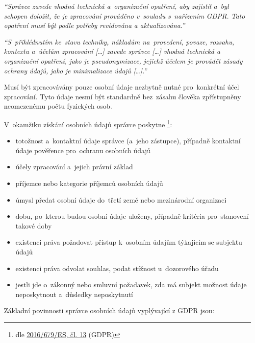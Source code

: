 \emph{\enquote{Správce zavede vhodná technická a~organizační opatření, aby zajistil a~byl schopen doložit, že je zpracování prováděno v~souladu s~nařízením GDPR. Tato opatření musí být podle potřeby revidována a aktualizována.}}

\emph{\enquote{S~přihlédnutím ke~stavu techniky, nákladům na~provedení, povaze, rozsahu, kontextu a~účelům zpracování [\dots] zavede správce [\dots] vhodná technická a organizační opatření, jako je pseudonymizace, jejichž účelem je provádět zásady ochrany údajů, jako je minimalizace údajů [\dots].}}

Musí být zpracovávány pouze osobní údaje nezbytně nutné pro~konkrétní účel zpracování. Tyto údaje nesmí být standardně bez~zásahu člověka zpřístupněny neomezenému počtu fyzických osob.

\vspace*{1em}

V~okamžiku získání osobních údajů správce poskytne%
\footnote{%
    dle \href{https://eur-lex.europa.eu/legal-content/CS/TXT/HTML/?uri=CELEX:32016R0679\#d1e2243-1-1}{2016/679/ES, čl. 13}  (GDPR)%
}:

\begin{itemize}
    \item totožnost a~kontaktní údaje správce (a~jeho zástupce), případně kontaktní údaje pověřence pro~ochranu osobních údajů
    \item účely zpracování a~jejich právní základ
    \item příjemce nebo kategorie příjemců osobních údajů
    \item úmysl předat osobní údaje do~třetí země nebo mezinárodní organizaci
    \item dobu, po~kterou budou osobní údaje uloženy, případně kritéria pro~stanovení takové doby
    \item existenci práva požadovat přístup k~osobním údajům týkajícím se subjektu údajů
    \item existenci práva odvolat souhlas, podat stížnost u~dozorového úřadu
    \item jestli jde o~zákonný nebo smluvní požadavek, zda má subjekt možnost údaje neposkytnout a~důsledky neposkytnutí
\end{itemize}

Základní povinnosti správce osobních údajů vyplývající z GDPR jsou:

